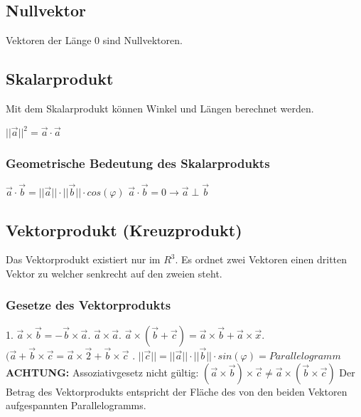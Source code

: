 \documentclass[11pt,a4paper,onecolumn]{scrartcl}
\begin{document}
\begin{flushleft}
\subsection{Nullvektor}
Vektoren der Länge 0 sind Nullvektoren.

\subsection{Skalarprodukt}
Mit dem Skalarprodukt können Winkel und Längen berechnet werden.

$ ||\vec{a}||^{2} = \vec{a}\cdot\vec{a}$

\subsubsection{Geometrische Bedeutung des Skalarprodukts}
$ \vec{a} \cdot \vec{b} = ||\vec{a}|| \cdot ||\vec{b} || \cdot cos(\varphi)$\linebreak
$ \vec{a} \cdot \vec{b} = 0 \rightarrow \vec{a} \perp \vec{b}$\linebreak


\subsection{Vektorprodukt (Kreuzprodukt)}
Das Vektorprodukt existiert nur im $R^{3}$. Es ordnet zwei Vektoren einen dritten Vektor zu welcher senkrecht auf den zweien steht.

\subsubsection{Gesetze des Vektorprodukts}
1. $\vec{a} \times \vec{b} = -\vec{b}\times\vec{a}$. $\vec{a}\times\vec{a}$. $ \vec{a}\times(\vec{b}+\vec{c}) = \vec{a}\times\vec{b}+\vec{a}\times\vec{x}$. $ (\vec{a}+\vec{b}\times\vec{c} = \vec{a}\times\vec{2} + \vec{b}\times\vec{c}$ . $||\vec{c}|| = ||\vec{a}|| \cdot ||\vec{b}|| \cdot sin(\varphi) = Parallelogramm $ \linebreak\linebreak
\textbf{ACHTUNG:} Assoziativgesetz nicht gültig:\linebreak
$(\vec{a}\times\vec{b})\times \vec{c} \neq \vec{a}\times(\vec{b}\times\vec{c})$\linebreak
Der Betrag des Vektorprodukts entspricht der Fläche des von den beiden Vektoren aufgespannten Parallelogramms.



\end{flushleft}
\end{document}
